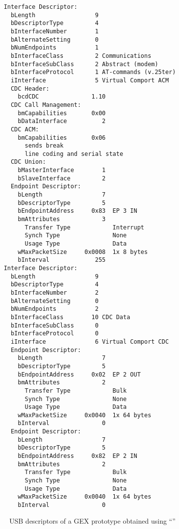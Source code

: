 \begin{minipage}[t]{0.5\textwidth}\scriptsize
\begin{verbatim}
    Interface Descriptor:
      bLength                 9
      bDescriptorType         4
      bInterfaceNumber        1
      bAlternateSetting       0
      bNumEndpoints           1
      bInterfaceClass         2 Communications
      bInterfaceSubClass      2 Abstract (modem)
      bInterfaceProtocol      1 AT-commands (v.25ter)
      iInterface              5 Virtual Comport ACM
      CDC Header:
        bcdCDC               1.10
      CDC Call Management:
        bmCapabilities       0x00
        bDataInterface          2
      CDC ACM:
        bmCapabilities       0x06
          sends break
          line coding and serial state
      CDC Union:
        bMasterInterface        1
        bSlaveInterface         2 
      Endpoint Descriptor:
        bLength                 7
        bDescriptorType         5
        bEndpointAddress     0x83  EP 3 IN
        bmAttributes            3
          Transfer Type            Interrupt
          Synch Type               None
          Usage Type               Data
        wMaxPacketSize     0x0008  1x 8 bytes
        bInterval             255
    Interface Descriptor:
      bLength                 9
      bDescriptorType         4
      bInterfaceNumber        2
      bAlternateSetting       0
      bNumEndpoints           2
      bInterfaceClass        10 CDC Data
      bInterfaceSubClass      0 
      bInterfaceProtocol      0 
      iInterface              6 Virtual Comport CDC
      Endpoint Descriptor:
        bLength                 7
        bDescriptorType         5
        bEndpointAddress     0x02  EP 2 OUT
        bmAttributes            2
          Transfer Type            Bulk
          Synch Type               None
          Usage Type               Data
        wMaxPacketSize     0x0040  1x 64 bytes
        bInterval               0
      Endpoint Descriptor:
        bLength                 7
        bDescriptorType         5
        bEndpointAddress     0x82  EP 2 IN
        bmAttributes            2
          Transfer Type            Bulk
          Synch Type               None
          Usage Type               Data
        wMaxPacketSize     0x0040  1x 64 bytes
        bInterval               0
\end{verbatim}
\end{minipage}\vspace{-1em}
\begin{figure}[H]
	\caption{\label{fig:gex-descriptors}USB descriptors of a GEX prototype obtained using ``''}
\end{figure}
